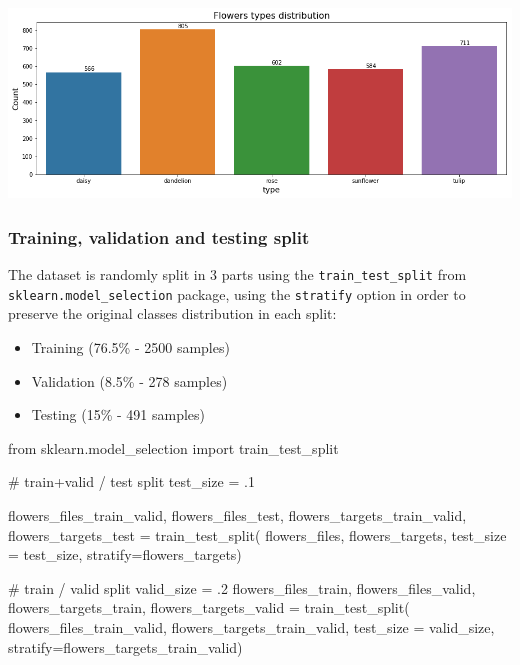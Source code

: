\begin{flushleft}
	\includegraphics[scale=.5]{./sections/03_methodology/output_13_0.png}
\end{flushleft}

\newpage
\subsubsection{Training, validation and testing split}

The dataset is randomly split in 3 parts using the \texttt{train\_test\_split} from \texttt{sklearn.model\_selection} package, using the \texttt{stratify} option in order to preserve the original classes distribution in each split:

\begin{itemize}
	\setlength\itemsep{1pt}
	\setlength{\parskip}{0pt}
	\setlength{\parsep}{0pt}
	\item Training (76.5\% - 2500 samples)
	\item Validation (8.5\% - 278 samples)
	\item Testing (15\% - 491 samples)
\end{itemize}

\begin{python}
from sklearn.model_selection import train_test_split	
	
# train+valid / test split
test_size = .1

flowers_files_train_valid, flowers_files_test, flowers_targets_train_valid, flowers_targets_test = train_test_split(
flowers_files, flowers_targets, 
test_size = test_size, 
stratify=flowers_targets)

# train / valid split
valid_size = .2
flowers_files_train, flowers_files_valid, flowers_targets_train, flowers_targets_valid = train_test_split(
flowers_files_train_valid, flowers_targets_train_valid, 
test_size = valid_size, 
stratify=flowers_targets_train_valid)
\end{python}

